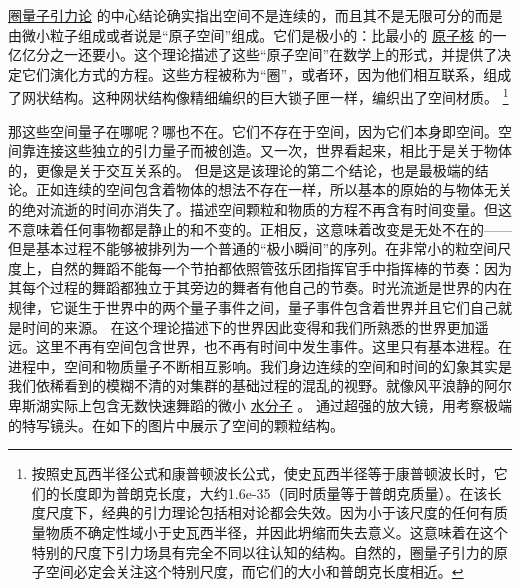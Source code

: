     
\href{http://toyhouse.cc/wiki/index.php/圈量子引力论}{圈量子引力论}
的中心结论确实指出空间不是连续的，而且其不是无限可分的而是由微小粒子组成或者说是“原子空间”组成。它们是极小的：比最小的
\href{http://toyhouse.cc/wiki/index.php/原子核}{原子核}
的一亿亿分之一还要小。这个理论描述了这些“原子空间”在数学上的形式，并提供了决定它们演化方式的方程。这些方程被称为“圈”，或者环，因为他们相互联系，组成了网状结构。这种网状结构像精细编织的巨大锁子匣一样，编织出了空间材质。
\footnote[4]
{ 
按照史瓦西半径公式和康普顿波长公式，使史瓦西半径等于康普顿波长时，它们的长度即为普朗克长度，大约1.6e-35（同时质量等于普朗克质量）。在该长度尺度下，经典的引力理论包括相对论都会失效。因为小于该尺度的任何有质量物质不确定性域小于史瓦西半径，并因此坍缩而失去意义。这意味着在这个特别的尺度下引力场具有完全不同以往认知的结构。自然的，圈量子引力的原子空间必定会关注这个特别尺度，而它们的大小和普朗克长度相近。
}

    那这些空间量子在哪呢？哪也不在。它们不存在于空间，因为它们本身即空间。空间靠连接这些独立的引力量子而被创造。又一次，世界看起来，相比于是关于物体的，更像是关于交互关系的。
    但是这是该理论的第二个结论，也是最极端的结论。正如连续的空间包含着物体的想法不存在一样，所以基本的原始的与物体无关的绝对流逝的时间亦消失了。描述空间颗粒和物质的方程不再含有时间变量。但这不意味着任何事物都是静止的和不变的。正相反，这意味着改变是无处不在的——但是基本过程不能够被排列为一个普通的“极小瞬间”的序列。在非常小的粒空间尺度上，自然的舞蹈不能每一个节拍都依照管弦乐团指挥官手中指挥棒的节奏：因为其每个过程的舞蹈都独立于其旁边的舞者有他自己的节奏。时光流逝是世界的内在规律，它诞生于世界中的两个量子事件之间，量子事件包含着世界并且它们自己就是时间的来源。
    在这个理论描述下的世界因此变得和我们所熟悉的世界更加遥远。这里不再有空间包含世界，也不再有时间中发生事件。这里只有基本进程。在进程中，空间和物质量子不断相互影响。我们身边连续的空间和时间的幻象其实是我们依稀看到的模糊不清的对集群的基础过程的混乱的视野。就像风平浪静的阿尔卑斯湖实际上包含无数快速舞蹈的微小
\href{http://toyhouse.cc/wiki/index.php/水分子}{水分子}
。
    通过超强的放大镜，用考察极端的特写镜头。在如下的图片中展示了空间的颗粒结构。

